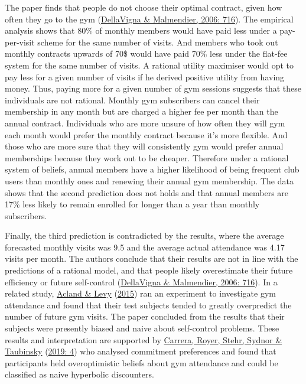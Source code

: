 \documentclass[11pt,preprint, authoryear]{elsarticle}
\numberwithin{equation}{section}
\numberwithin{figure}{section}
\numberwithin{table}{section}
\begin{document}
The paper finds that people do not choose their optimal contract, given
how often they go to the gym (\protect\hyperlink{ref-gym}{DellaVigna \&
Malmendier, 2006: 716}). The empirical analysis shows that 80\% of
monthly members would have paid less under a pay-per-visit scheme for
the same number of visits. And members who took out monthly contracts
upwards of 70\$ would have paid 70\% less under the flat-fee system for
the same number of visits. A rational utility maximiser would opt to pay
less for a given number of visits if he derived positive utility from
having money. Thus, paying more for a given number of gym sessions
suggests that these individuals are not rational. Monthly gym
subscribers can cancel their membership in any month but are charged a
higher fee per month than the annual contract. Individuals who are more
unsure of how often they will gym each month would prefer the monthly
contract because it's more flexible. And those who are more sure that
they will consistently gym would prefer annual memberships because they
work out to be cheaper. Therefore under a rational system of beliefs,
annual members have a higher likelihood of being frequent club users
than monthly ones and renewing their annual gym membership. The data
shows that the second prediction does not holds and that annual members
are 17\% less likely to remain enrolled for longer than a year than
monthly subscribers.

Finally, the third prediction is contradicted by the results, where the
average forecasted monthly visits was 9.5 and the average actual
attendance was 4.17 visits per month. The authors conclude that their
results are not in line with the predictions of a rational model, and
that people likely overestimate their future efficiency or future
self-control (\protect\hyperlink{ref-gym}{DellaVigna \& Malmendier,
2006: 716}). In a related study, \protect\hyperlink{ref-gymm}{Acland \&
Levy} (\protect\hyperlink{ref-gymm}{2015}) ran an experiment to
investigate gym attendance and found that their test subjects tended to
greatly overpredict the number of future gym visits. The paper concluded
from the results that their subjects were presently biased and naive
about self-control problems. These results and interpretation are
supported by \protect\hyperlink{ref-comm}{Carrera, Royer, Stehr, Sydnor
\& Taubinsky} (\protect\hyperlink{ref-comm}{2019: 4}) who analysed
commitment preferences and found that participants held overoptimistic
beliefs about gym attendance and could be classified as naive hyperbolic
discounters.
\end{document}
